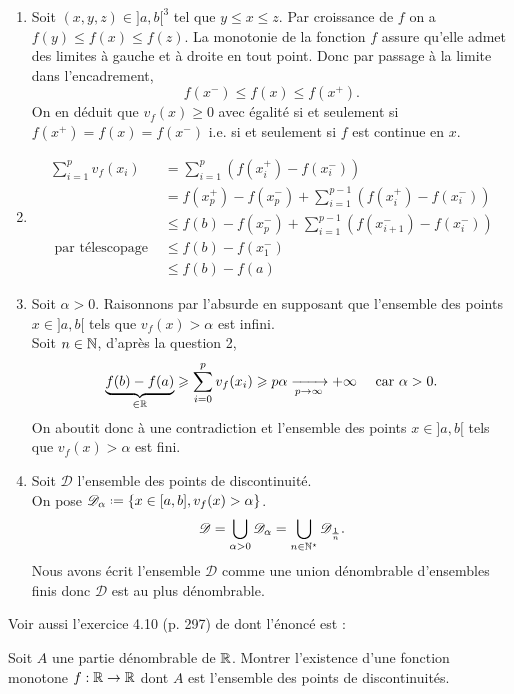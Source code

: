 \begin{solution}
    \begin{enumerate}
        \item Soit $(x, y, z) \in ]a,b[^3$ tel que $y \leqslant x \leqslant z$. Par croissance de $f$ on a $f(y) \leqslant f(x) \leqslant f(z)$. La monotonie de la fonction $f$ assure qu'elle admet des limites à gauche et à droite en tout point. Donc par passage à la limite dans l'encadrement, 
        $$f(x^-) \leqslant f(x) \leqslant f(x^+).$$
        On en déduit que $v_f(x) \geqslant 0$ avec égalité si et seulement si $f(x^+)=f(x)=f(x^-)$ i.e. si et seulement si $f$ est continue en $x$. 
        \item \begin{align*}
            \sum_{i=1}^p v_f(x_i) &= \sum_{i=1}^p \left( f(x_i^+) - f(x_i^-)\right) \\
            &= f(x_p^+)-f(x_p^-) + \sum_{i=1}^{p-1} \left( f(x_i^+) - f(x_i^-)\right) \\
            &\leqslant f(b) - f(x_p^-) + \sum_{i=1}^{p-1} \left( f(x_{i+1}^-) - f(x_i^-)\right) \\
            \text{ par télescopage } &\leqslant f(b) - f(x_1^-) \\
            &\leqslant f(b) - f(a)
        \end{align*}
        \item Soit $\alpha > 0$. Raisonnons par l'absurde en supposant que l'ensemble des points $x \in ]a, b[$ tels que $v_f(x) > \alpha$ est infini. \\
        Soit $n \in \mathbb{N}$, d'après la question 2, 
        $$\underbrace{f(b)-f(a)}_{\in \mathbb{R}} \geqslant \sum_{i=0}^p v_f(x_i) \geqslant p \alpha \xrightarrow[p \to \infty]{} + \infty \quad \text{ car } \alpha > 0.$$
        On aboutit donc à une contradiction et l'ensemble des points $x \in ]a, b[$ tels que $v_f(x) > \alpha$ est fini. 
        \item Soit $\mathscr{D}$ l'ensemble des points de discontinuité. \\ 
        On pose $\mathscr{D}_{\alpha} \defeq \left\{ x \in [a,b], v_f(x) > \alpha \right\}$.
        $$\mathscr{D} = \bigcup_{\alpha > 0} \mathscr{D}_\alpha = \bigcup_{n \in \mathbb{N}^\star} \mathscr{D}_\frac{1}{n}.$$
        Nous avons écrit l'ensemble $\mathscr{D}$ comme une union dénombrable d'ensembles finis donc $\mathscr{D}$ est au plus dénombrable.
    \end{enumerate}
\end{solution}

Voir aussi l'exercice 4.10 (p. 297) de \cite{oraux_x_ens_3} dont l'énoncé est :
\begin{exercice}
    Soit $A$ une partie dénombrable de $\mathbb{R}$. Montrer l'existence d'une fonction monotone $f: \mathbb{R} \to \mathbb{R}$ dont $A$ est l'ensemble des points de discontinuités.
\end{exercice}   